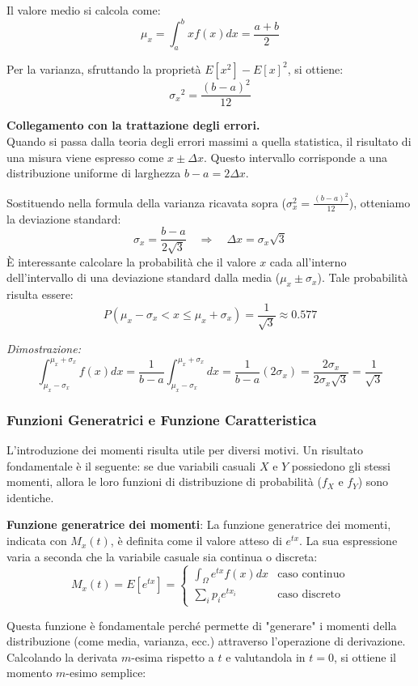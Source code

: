 \documentclass[openany,a4paper,12pt]{book}
\theoremstyle{remark}
\begin{document}
Il valore medio si calcola come:
\[
\mu_x=\int_{a}^{b}x f(x) dx = \frac{a+b}{2}
\]


Per la varianza, sfruttando la proprietà $E[x^2]-{E[x]}^2$, si ottiene:
\[
{\sigma_x}^2 = \frac{{(b-a)^2}}{12}
\]


\begin{nota}
    \textbf{Collegamento con la trattazione degli errori.} \\
    Quando si passa dalla teoria degli errori massimi a quella statistica, il risultato di una misura viene espresso come $x \pm \Delta x$. Questo intervallo corrisponde a una distribuzione uniforme di larghezza $b-a = 2\Delta x$.

    Sostituendo nella formula della varianza ricavata sopra ($\sigma_x^2=\frac{(b-a)^2}{12}$), otteniamo la deviazione standard:
    \[
    \sigma_x=\frac{b-a}{2\sqrt{3}} \quad \Rightarrow \quad \Delta x = \sigma_x \sqrt{3}
    \]
    È interessante calcolare la probabilità che il valore $x$ cada all'interno dell'intervallo di una deviazione standard dalla media ($\mu_x \pm \sigma_x$). Tale probabilità risulta essere:
    \[
    P(\mu_x-\sigma_x < x \leq \mu_x + \sigma_x) = \frac{1}{\sqrt{3}} \approx 0.577
    \]
    
    \textit{Dimostrazione:}
    \[
    \int_{\mu_x-\sigma_x}^{\mu_x+\sigma_x} f(x)dx = \frac{1}{b-a}\int_{\mu_x-\sigma_x}^{\mu_x+\sigma_x} dx = \frac{1}{b-a} (2 \sigma_x) = \frac{2\sigma_x}{2\sigma_x\sqrt{3}} = \frac{1}{\sqrt{3}}
    \]
\end{nota}

\vspace{1 cm}




\vspace{1 cm}
\subsubsection*{Funzioni Generatrici e Funzione Caratteristica}
L'introduzione dei momenti risulta utile per diversi motivi. Un risultato fondamentale è il seguente: se due variabili casuali $X$ e $Y$ possiedono gli stessi momenti, allora le loro funzioni di distribuzione di probabilità ($f_X$ e $f_Y$) sono identiche.

\begin{definizione}
    \textbf{Funzione generatrice dei momenti}:
        La funzione generatrice dei momenti, indicata con $M_x(t)$, è definita come il valore atteso di $e^{tx}$. La sua espressione varia a seconda che la variabile casuale sia continua o discreta:
    \[
    M_x(t) = E[e^{tx}] = 
    \begin{cases} 
    \displaystyle \int_\Omega e^{tx}f(x) dx & \text{caso continuo} \\[1em]
    \displaystyle \sum_i p_i e^{tx_i} & \text{caso discreto}
    \end{cases}
    \]
\end{definizione}
Questa funzione è fondamentale perché permette di "generare" i momenti della distribuzione (come media, varianza, ecc.) attraverso l'operazione di derivazione. Calcolando la derivata $m$-esima rispetto a $t$ e valutandola in $t=0$, si ottiene il momento $m$-esimo semplice:
\end{document}
